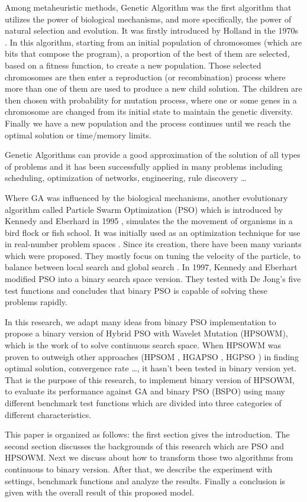 Among metaheuristic methods, Genetic Algorithm was the first algorithm that utilizes the power of biological mechanisms, and more specifically, the power of natural selection and evolution. It was firstly introduced by Holland in the 1970s \cite{holland1992genetic}. In this algorithm, starting from an initial population of chromosomes (which are bits that compose the program), a proportion of the best of them are selected, based on a fitness function, to create a new population. Those selected chromosomes are then enter a reproduction (or recombination) process where more than one of them are used to produce a new child solution. The children are then chosen with probability for mutation process, where one or some genes in a chromosome are changed from its initial state to maintain the genetic diversity. Finally we have a new population and the process continues until we reach the optimal solution or time/memory limits.

Genetic Algorithms can provide a good approximation of the solution of all types of problems and it has been successfully applied in many problems including scheduling, optimization of networks, engineering, rule discovery \ldots \cite{ross1994applications}

Where GA was influenced by the biological mechanisms, another evolutionary algorithm called Particle Swarm Optimization (PSO) which is introduced by Kennedy and Eberhard in 1995 \cite{kennedy2010particle}, simulates the the movement of organisms in a bird flock or fish school. It was initially used as an optimization technique for use in real-number problem spaces \cite{kennedy1997discrete}. Since its creation, there have been many variants which were proposed. They mostly focus on tuning the velocity of the particle, to balance between local search and global search \cite{shi1998modified}\cite{clerc2002particle}. In 1997, Kennedy and Eberhart modified PSO into a binary search space version. They tested with De Jong's five test functions \cite{de1975analysis} and concludes that binary PSO is capable of solving these problems rapidly. 

In this research, we adapt many ideas from binary PSO implementation to propose a binary version of Hybrid PSO with Wavelet Mutation (HPSOWM), which is the work of \cite{ling2008hybrid} to solve continuous search space. When HPSOWM was proven to outweigh other approaches (HPSOM \cite{esmin2005hybrid}, HGAPSO \cite{juang2004hybrid}, HGPSO \cite{noel2004simulation}) in finding optimal solution, convergence rate \ldots, it hasn't been tested in binary version yet. That is the purpose of this research, to implement binary version of HPSOWM, to evaluate its performance against GA and binary PSO (BSPO) using many different benchmark test functions which are divided into three categories of different characteristics.

This paper is organized as follows: the first section gives the introduction. The second section discusses the backgrounds of this research which are PSO and HPSOWM. Next we discuss about how to transform those two algorithms from continuous to binary version. After that, we describe the experiment with settings, benchmark functions and analyze the results. Finally a conclusion is given with the overall result of this proposed model.